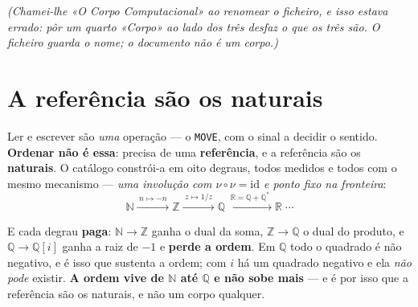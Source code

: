 \documentclass[11pt,a4paper]{article}
\newcommand{\N}{\ensuremath{\mathbb{N}}}
\newcommand{\Z}{\ensuremath{\mathbb{Z}}}
\newcommand{\Q}{\ensuremath{\mathbb{Q}}}
\newcommand{\R}{\ensuremath{\mathbb{R}}}
\begin{document}
\medskip
\noindent\emph{(Chamei-lhe «O Corpo Computacional» ao renomear o ficheiro, e isso estava
errado: pôr um quarto «Corpo» ao lado dos três desfaz o que os três são. O ficheiro guarda
o nome; o documento não é um corpo.)}

\begin{abstract}
\noindent \textbf{Ler e escrever são uma operação; ordenar não é essa} --- ela precisa de uma
\emph{referência}, e a referência são os \textbf{naturais}, construídos em oito degraus que são
todos involuções. \textbf{Uma sequência é uma régua}, e ordená-la é levá-la ao seu \textbf{ponto fixo} ---
a forma canónica --- de onde se converte para qualquer outra. É esse mapa entre réguas que aqui se
constrói e se valida, com as peças da teoria da dualidade: a \textbf{estaca} $x\mapsto x^{\dagger}$,
a \textbf{Lei 2} $-f=f^{-1}$, a \textbf{bidualidade} $J^{4}=\mathrm{id}$ e o \textbf{trial}. Nenhum
elemento é comparado com outro. \textbf{A permutação é o dual}, e guardá-la torna o processo
\emph{invertível}: a volta é exata e o apagamento é \textbf{zero}. O critério não é a lista sair
crescente --- é a volta fechar.
\end{abstract}

\section{A referência são os naturais}

Ler e escrever são \emph{uma} operação --- o \texttt{MOVE}, com o sinal a decidir o sentido.
\textbf{Ordenar não é essa}: precisa de uma \textbf{referência}, e a referência são os
\textbf{naturais}. O catálogo constrói-a em oito degraus, todos medidos e todos com o mesmo
mecanismo --- \emph{uma involução com $\nu\circ\nu=\mathrm{id}$ e ponto fixo na fronteira}:
\[
  \N \xrightarrow{\;n\mapsto-n\;} \Z
  \xrightarrow{\;z\mapsto 1/z\;} \Q
  \xrightarrow{\;\R=\Q+\Q^{*}\;} \R \;\cdots
\]

\noindent E cada degrau \textbf{paga}: $\N\to\Z$ ganha o dual da soma, $\Z\to\Q$ o dual do
produto, e $\Q\to\Q[i]$ ganha a raiz de $-1$ e \textbf{perde a ordem}. Em $\Q$ todo o quadrado é
não negativo, e é isso que sustenta a ordem; com $i$ há um quadrado negativo e ela \emph{não pode}
existir. \textbf{A ordem vive de $\N$ até $\Q$ e não sobe mais} --- e é por isso que a referência
são os naturais, e não um corpo qualquer.
\end{document}
